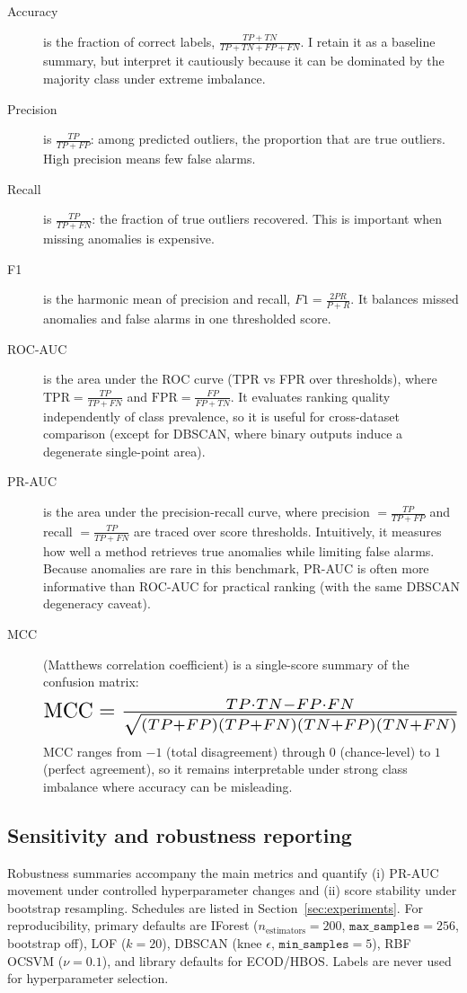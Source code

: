 \documentclass[cameraready]{Interspeech}
\begin{document}
\begin{description}
    \item[Accuracy] is the fraction of correct labels, \(\frac{TP+TN}{TP+TN+FP+FN}\). I retain it as a baseline summary, but interpret it cautiously because it can be dominated by the majority class under extreme imbalance.
    \item[Precision] is \(\frac{TP}{TP+FP}\): among predicted outliers, the proportion that are true outliers. High precision means few false alarms.
    \item[Recall] is \(\frac{TP}{TP+FN}\): the fraction of true outliers recovered. This is important when missing anomalies is expensive.
    \item[F1] is the harmonic mean of precision and recall, \(F1=\frac{2PR}{P+R}\). It balances missed anomalies and false alarms in one thresholded score.
    \item[ROC-AUC] is the area under the ROC curve (TPR vs FPR over thresholds), where \(\mathrm{TPR}=\frac{TP}{TP+FN}\) and \(\mathrm{FPR}=\frac{FP}{FP+TN}\). It evaluates ranking quality independently of class prevalence, so it is useful for cross-dataset comparison (except for DBSCAN, where binary outputs induce a degenerate single-point area).
    \item[PR-AUC] is the area under the precision-recall curve, where precision \(=\frac{TP}{TP+FP}\) and recall \(=\frac{TP}{TP+FN}\) are traced over score thresholds. Intuitively, it measures how well a method retrieves true anomalies while limiting false alarms. Because anomalies are rare in this benchmark, PR-AUC is often more informative than ROC-AUC for practical ranking (with the same DBSCAN degeneracy caveat).
    \item[MCC] (Matthews correlation coefficient) is a single-score summary of the confusion matrix:
    \[
    \resizebox{0.96\columnwidth}{!}{$
    \mathrm{MCC}=\frac{TP\cdot TN-FP\cdot FN}
    {\sqrt{(TP+FP)(TP+FN)(TN+FP)(TN+FN)}}
    $}
    \]
    MCC ranges from \(-1\) (total disagreement) through \(0\) (chance-level) to \(1\) (perfect agreement), so it remains interpretable under strong class imbalance where accuracy can be misleading.
\end{description}

\subsection{Sensitivity and robustness reporting}

Robustness summaries accompany the main metrics and quantify (i) PR-AUC movement under controlled hyperparameter changes and (ii) score stability under bootstrap resampling. Schedules are listed in Section~\ref{sec:experiments}. For reproducibility, primary defaults are IForest (\(n_{\text{estimators}}=200\), \(\texttt{max\_samples}=256\), bootstrap off), LOF (\(k=20\)), DBSCAN (knee \(\epsilon\), \(\texttt{min\_samples}=5\)), RBF OCSVM (\(\nu=0.1\)), and library defaults for ECOD/HBOS. Labels are never used for hyperparameter selection.
\end{document}
